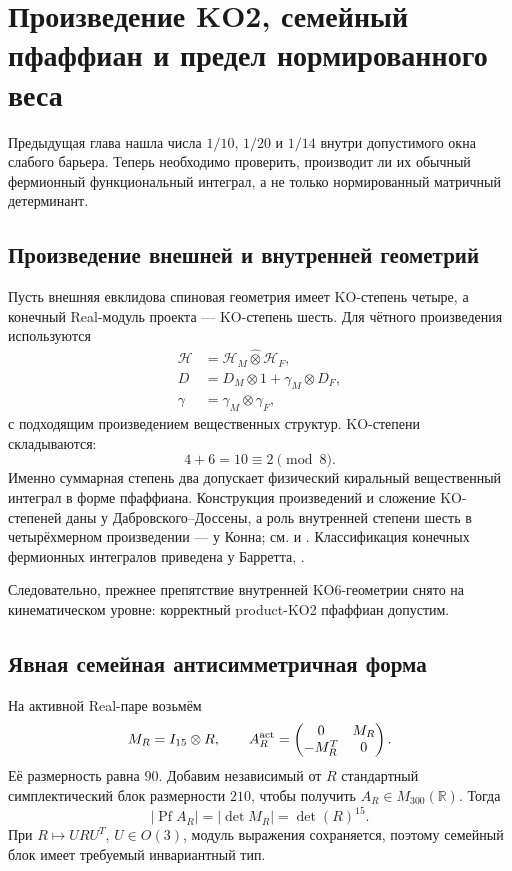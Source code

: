 \chapter{Произведение KO2, семейный пфаффиан и предел нормированного веса}

Предыдущая глава нашла числа $1/10$, $1/20$ и $1/14$ внутри допустимого
окна слабого барьера. Теперь необходимо проверить, производит ли их
обычный фермионный функциональный интеграл, а не только нормированный
матричный детерминант.

\section{Произведение внешней и внутренней геометрий}

Пусть внешняя евклидова спиновая геометрия имеет KO-степень четыре, а
конечный Real-модуль проекта --- KO-степень шесть. Для чётного
произведения используются
\begin{align}
 \mathcal H&=\mathcal H_M\widehat\otimes\mathcal H_F,\\
 D&=D_M\otimes1+\gamma_M\otimes D_F,\\
 \gamma&=\gamma_M\otimes\gamma_F,
\end{align}
с подходящим произведением вещественных структур. KO-степени складываются:
\begin{equation}
 4+6=10\equiv2\pmod8.
 \label{eq:v6-product-ko2-sum}
\end{equation}
Именно суммарная степень два допускает физический киральный вещественный
интеграл в форме пфаффиана. Конструкция произведений и сложение
KO-степеней даны у Дабровского--Доссены, а роль внутренней степени шесть
в четырёхмерном произведении --- у Конна; см.
 и . Классификация конечных
фермионных интегралов приведена у Барретта, .

Следовательно, прежнее препятствие внутренней KO6-геометрии снято на
кинематическом уровне: корректный product-KO2 пфаффиан допустим.

\section{Явная семейная антисимметричная форма}

На активной Real-паре возьмём
\begin{equation}
 M_R=I_{15}\otimes R,
 \qquad
 A_R^{\rm act}=
 \begin{pmatrix}
 0&M_R\\
 -M_R^T&0
 \end{pmatrix}.
 \label{eq:v6-ko2-active-family-form}
\end{equation}
Её размерность равна $90$. Добавим независимый от $R$ стандартный
симплектический блок размерности $210$, чтобы получить
$A_R\in M_{300}(\mathbb R)$. Тогда
\begin{equation}
 |\operatorname{Pf}A_R|
 =|\det M_R|
 =\det(R)^{15}.
 \label{eq:v6-ordinary-family-pfaffian}
\end{equation}
При $R\mapsto URU^T$, $U\in O(3)$, модуль выражения сохраняется, поэтому
семейный блок имеет требуемый инвариантный тип.

